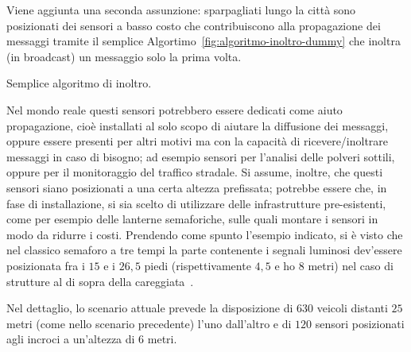 Viene aggiunta una seconda assunzione: sparpagliati lungo la città sono posizionati dei sensori a basso costo
che contribuiscono alla propagazione dei messaggi tramite il semplice Algortimo~\ref{fig:algoritmo-inoltro-dummy}
che inoltra (in broadcast) un messaggio solo la prima volta.
%
\begin{italianalgorithm}[h]
\begin{algorithmic}[1]
		\EndIf{}
\end{algorithmic}
\caption{Semplice algoritmo di inoltro.}\label{fig:algoritmo-inoltro-dummy}
\end{italianalgorithm}
%
Nel mondo reale questi sensori potrebbero essere dedicati come aiuto propagazione,
cioè installati al solo scopo di aiutare la diffusione dei messaggi,
oppure essere presenti per altri motivi ma con la capacità di ricevere/inoltrare messaggi
in caso di bisogno; ad esempio sensori per l'analisi delle polveri sottili,
oppure per il monitoraggio del traffico stradale.
Si assume, inoltre, che questi sensori siano posizionati a una certa altezza prefissata;
potrebbe essere che, in fase di installazione, si sia scelto di utilizzare delle infrastrutture
pre-esistenti, come per esempio delle lanterne semaforiche, sulle quali montare i sensori in modo da ridurre i costi.
Prendendo come spunto l'esempio indicato, si è visto che nel classico semaforo a tre tempi
la parte contenente i segnali luminosi dev'essere posizionata
fra i $15$ e i $26,5$ piedi (rispettivamente $4,5$ e ho $8$ metri) nel caso di strutture al di sopra della
careggiata~\cite{MUTCD}.

Nel dettaglio, lo scenario attuale prevede la disposizione di $630$ veicoli distanti
$25$ metri (come nello scenario precedente) l'uno dall'altro
e di $120$ sensori posizionati agli incroci a un'altezza di $6$ metri.


%
